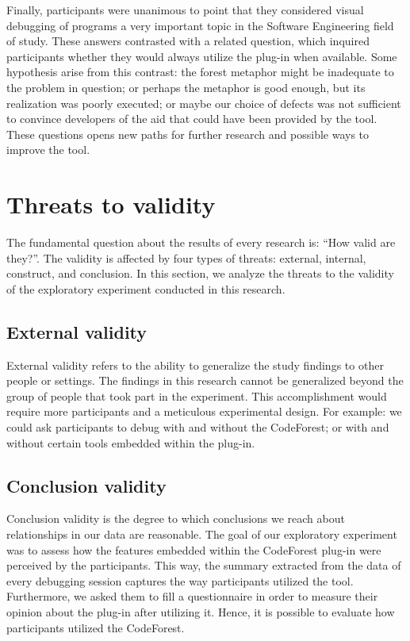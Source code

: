 Finally, participants were unanimous to point that they considered visual
debugging of programs a very important topic in the Software Engineering field
of study. These answers contrasted with a related question, which inquired
participants whether they would always utilize the plug-in when available. Some
hypothesis arise from this contrast: the forest metaphor might be inadequate to
the problem in question; or perhaps the metaphor is good enough, but its
realization was poorly executed; or maybe our choice of defects was not
sufficient to convince developers of the aid that could have been provided by
the tool. These questions opens new paths for further research and possible ways
to improve the tool.

\section{Threats to validity}

The fundamental question about the results of every research is: ``How
valid are they?''. The validity is affected by four types of threats: external, internal,
construct, and conclusion. In this section, we analyze the threats to the
validity of the exploratory experiment conducted in this research.

\subsection{External validity}

External validity refers to the ability to generalize the study findings to
other people or settings. The findings in this research cannot be generalized
beyond the group of people that took part in the experiment. This accomplishment
would require more participants and a meticulous experimental design. For
example: we could ask participants to debug with and without the CodeForest; or
with and without certain tools embedded within the plug-in.

\subsection{Conclusion validity}

Conclusion validity is the degree to which conclusions we reach about
relationships in our data are reasonable. The goal of our exploratory experiment
was to assess how the features embedded within the CodeForest plug-in were
perceived by the participants. This way, the summary extracted from the data of
every debugging session captures the way participants utilized the tool.
Furthermore, we asked them to fill a questionnaire in order to measure their
opinion about the plug-in after utilizing it. Hence, it is possible to evaluate
how participants utilized the CodeForest.

